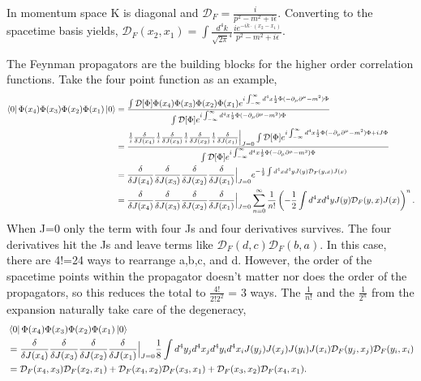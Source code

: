 In momentum space K is diagonal and $\mathcal{D}_F = \frac{i}{p^2-m^2 + i\epsilon}$. Converting to the spacetime basis yields, $\mathcal{D}_F(x_2,x_1) = \int \frac{d^4k}{\sqrt{2\pi}^4}\frac{i e^{-ik\cdot(x_2-x_1)}}{p^2-m^2 + i\epsilon}$. 

The Feynman propagators are the building blocks for the higher order correlation functions. Take the four point function as an example,
\begin{equation}
\begin{split}
\bra{0}\Phi(x_4)\Phi(x_3)\Phi(x_2)\Phi(x_1)\ket{0} &= 
\frac{\int \mathcal{D}[\Phi]\Phi(x_4)\Phi(x_3)\Phi(x_2)\Phi(x_1)e^{i\int_{-\infty}^{\infty} d^4x \frac{1}{2}\Phi (-\partial_\mu\partial^\mu - m^2)\Phi}}
{\int \mathcal{D}[\Phi]e^{i\int_{-\infty}^{\infty} d^4x \frac{1}{2}\Phi (-\partial_\mu\partial^\mu - m^2)\Phi}} \\
&= \frac{\frac{1}{i}\frac{\delta}{\delta J(x_4)}\frac{1}{i}\frac{\delta}{\delta J(x_3)}\frac{1}{i}\frac{\delta}{\delta J(x_2)}\frac{1}{i}\frac{\delta}{\delta J(x_1)}\Big|_{J=0}\int \mathcal{D}[\Phi]e^{i\int_{-\infty}^{\infty} d^4x \frac{1}{2}\Phi (-\partial_\mu\partial^\mu - m^2)\Phi + iJ\Phi}}
{\int \mathcal{D}[\Phi]e^{i\int_{-\infty}^{\infty} d^4x \frac{1}{2}\Phi (-\partial_\mu\partial^\mu - m^2)\Phi}} \\
&= \frac{\delta}{\delta J(x_4)}\frac{\delta}{\delta J(x_3)}\frac{\delta}{\delta J(x_2)}\frac{\delta}{\delta J(x_1)}\Big|_{J=0}e^{-\frac{1}{2}\int d^4x d^4y J(y) \mathcal{D}_F(y,x) J(x)} \\
&= \frac{\delta}{\delta J(x_4)}\frac{\delta}{\delta J(x_3)}\frac{\delta}{\delta J(x_2)}\frac{\delta}{\delta J(x_1)}\Big|_{J=0} 
\sum_{n=0}^\infty \frac{1}{n!}\left( -\frac{1}{2}\int d^4x d^4y J(y) \mathcal{D}_F(y,x) J(x) \right)^n. 
\end{split}
\end{equation}
When J=0 only the term with four Js and four derivatives survives. The four derivatives hit the Js and leave terms like $\mathcal{D}_F(d,c) \mathcal{D}_F(b,a)$. In this case, there are 4!=24 ways to rearrange a,b,c, and d. However, the order of the spacetime points within the propagator doesn't matter nor does the order of the propagators, so this reduces the total to $\frac{4!}{2!2^2}$ = 3 ways. The $\frac{1}{n!}$ and the $\frac{1}{2^n}$ from the expansion naturally take care of the degeneracy,
\begin{equation}
\begin{split}
&\bra{0}\Phi(x_4)\Phi(x_3)\Phi(x_2)\Phi(x_1)\ket{0} \\
&= \frac{\delta}{\delta J(x_4)}\frac{\delta}{\delta J(x_3)}\frac{\delta}{\delta J(x_2)}\frac{\delta}{\delta J(x_1)}\Big|_{J=0} 
\frac{1}{8}\int d^4y_j d^4x_j d^4y_i d^4x_i J(y_j) J(x_j) J(y_i) J(x_i) \mathcal{D}_F(y_j,x_j) \mathcal{D}_F(y_i,x_i) \\ 
&= \mathcal{D}_F(x_4, x_3) \mathcal{D}_F(x_2, x_1) + \mathcal{D}_F(x_4, x_2) \mathcal{D}_F(x_3, x_1) + \mathcal{D}_F(x_3, x_2) \mathcal{D}_F(x_4, x_1).
\end{split}
\end{equation}
